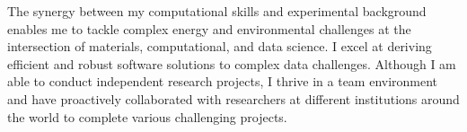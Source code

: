 

\begin{cvparagraph}

The synergy between my computational skills and experimental background enables me to tackle complex energy and environmental challenges at the intersection of materials, computational, and data science. I excel at deriving efficient and robust software solutions to complex data challenges. Although I am able to conduct independent research projects, I thrive in a team environment and have proactively collaborated with researchers at different institutions around the world to complete various challenging projects. 
\end{cvparagraph}
